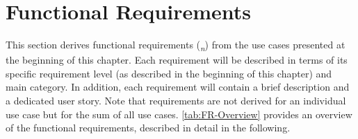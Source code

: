 \newpage

\section{Functional Requirements}\label{sec:Functional Requirements}


\noindent This section derives functional requirements (\textsubscript{\textit{n}}) from the use cases presented at the beginning of this chapter. Each requirement will be described in terms of its specific requirement level (as described in the beginning of this chapter) and main category. In addition, each requirement will contain a brief description and a dedicated user story. Note that requirements are not derived for an individual use case but for the sum of all use cases. \autoref{tab:FR-Overview} provides an overview of the functional requirements, described in detail in the following.

